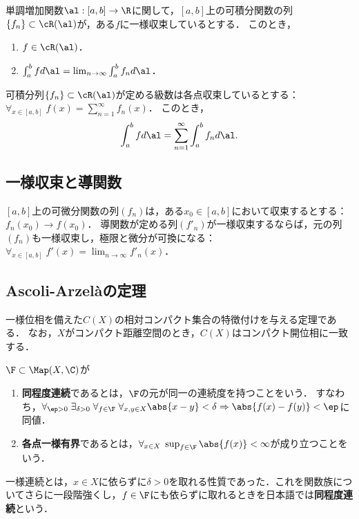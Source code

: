 \documentclass[uplatex, dvipdfmx]{jsreport}
\begin{document}
\begin{theorem}
    単調増加関数$\al:[a,b]\to\R$に関して，$[a,b]$上の可積分関数の列$\{f_n\}\subset\cR(\al)$が，ある$f$に一様収束しているとする．
    このとき，
    \begin{enumerate}
        \item $f\in\cR(\al)$．
        \item $\int^b_afd\al=\lim_{n\to\infty}\int^b_af_nd\al$．
    \end{enumerate}
\end{theorem}

\begin{corollary}[項別積分]
    可積分列$\{f_n\}\subset\cR(\al)$が定める級数は各点収束しているとする：$\forall_{x\in[a,b]}\;f(x)=\sum^\infty_{n=1}f_n(x)$．
    このとき，
    \[\int^b_afd\al=\sum^\infty_{n=1}\int^b_af_nd\al.\]
\end{corollary}

\subsection{一様収束と導関数}

\begin{theorem}
    $[a,b]$上の可微分関数の列$(f_n)$は，ある$x_0\in[a,b]$において収束するとする：$f_n(x_0)\to f(x_0)$．
    導関数が定める列$(f'_n)$が一様収束するならば，元の列$(f_n)$も一様収束し，極限と微分が可換になる：$\forall_{x\in[a,b]}\;f'(x)=\lim_{n\to\infty}f'_n(x)$．
\end{theorem}

\subsection{Ascoli-Arzelàの定理}

\begin{tcolorbox}[colframe=ForestGreen, colback=ForestGreen!10!white,breakable,colbacktitle=ForestGreen!40!white,coltitle=black,fonttitle=\bfseries\sffamily,
title=]
    一様位相を備えた$C(X)$の相対コンパクト集合の特徴付けを与える定理である．
    なお，$X$がコンパクト距離空間のとき，$C(X)$はコンパクト開位相に一致する．
\end{tcolorbox}

\begin{definition}
    $\F\subset\Map(X,\C)$が
    \begin{enumerate}
        \item \textbf{同程度連続}であるとは，$\F$の元が同一の連続度を持つことをいう．
        すなわち，$\forall_{\ep>0}\;\exists_{\delta>0}\;\forall_{f\in\F}\;\forall_{x,y\in X}\abs{x-y}<\delta\Rightarrow\abs{f(x)-f(y)}<\ep$に同値．
        \item \textbf{各点一様有界}であるとは，$\forall_{x\in X}\;\sup_{f\in\F}\abs{f(x)}<\infty$が成り立つことをいう．
    \end{enumerate}
\end{definition}
\begin{remarks}
    一様連続とは，$x\in X$に依らずに$\delta>0$を取れる性質であった．これを関数族についてさらに一段階強くし，$f\in\F$にも依らずに取れるときを日本語では\textbf{同程度連続}という．
\end{remarks}
\end{document}
